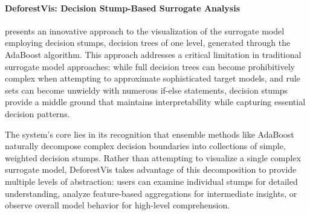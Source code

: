 \paragraph{DeforestVis: Decision Stump-Based Surrogate Analysis}

\cite{Chatzimparmpas2023DeforestVisBA} presents an innovative approach to the visualization of the surrogate model employing decision stumps, decision trees of one level, generated through the AdaBoost \cite{FREUND1997119} algorithm. This approach addresses a critical limitation in traditional surrogate model approaches: while full decision trees can become prohibitively complex when attempting to approximate sophisticated target models, and rule sets can become unwieldy with numerous if-else statements, decision stumps provide a middle ground that maintains interpretability while capturing essential decision patterns.

The system's core lies in its recognition that ensemble methods like AdaBoost naturally decompose complex decision boundaries into collections of simple, weighted decision stumps. Rather than attempting to visualize a single complex surrogate model, DeforestVis takes advantage of this decomposition to provide multiple levels of abstraction: users can examine individual stumps for detailed understanding, analyze feature-based aggregations for intermediate insights, or observe overall model behavior for high-level comprehension.

